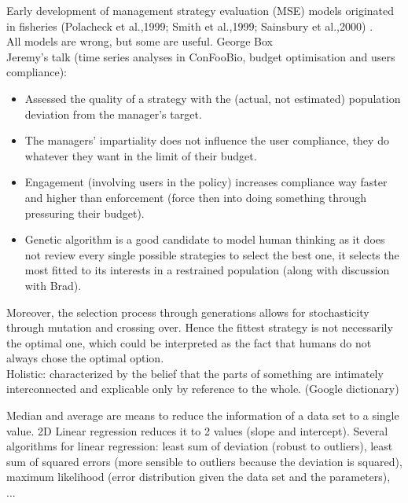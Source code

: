 \documentclass[12pt]{article}
\begin{document}
Early  development  of  management  strategy  evaluation  (MSE)  models  originated  in  fisheries (Polacheck  et  al.,1999; Smith  et  al.,1999; Sainsbury  et  al.,2000) \citep{duthie2018}.\\

All models are wrong, but some are useful. George Box\\

Jeremy's talk (time series analyses in ConFooBio, budget optimisation and users compliance):
\begin{itemize}
    \item Assessed the quality of a strategy with the (actual, not estimated) population deviation from the manager's target.
    \item The managers' impartiality does not influence the user compliance, they do whatever they want in the limit of their budget.
    \item Engagement (involving users in the policy) increases compliance way faster and higher than enforcement (force then into doing something through pressuring their budget).
    \item  Genetic algorithm is a good candidate to model human thinking as it does not review every single possible strategies to select the best one, it selects the most fitted to its interests in a restrained population (along with discussion with Brad).
\end{itemize}
Moreover, the selection process through generations allows for stochasticity through mutation and crossing over. Hence the fittest strategy is not necessarily the optimal one, which could be interpreted as the fact that humans do not always chose the optimal option. \\

Holistic: characterized by the belief that the parts of something are intimately interconnected and explicable only by reference to the whole. (Google dictionary)

Median and average are means to reduce the information of a data set to a single value.
2D Linear regression reduces it to 2 values (slope and intercept).
Several algorithms for linear regression: least sum of deviation (robust to outliers), least sum of squared errors (more sensible to outliers because the deviation is squared), maximum likelihood (error distribution given the data set and the parameters), ...
\end{document}
